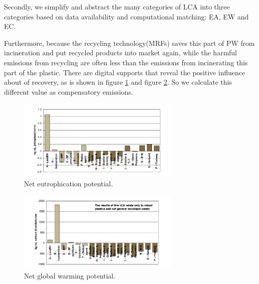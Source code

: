 \documentclass{mcmthesis}
\begin{document}
Secondly, we simplify and abstract the many categories of LCA into three categories based on data availability and computational matching: EA, EW and EC.

Furthermore, because the recycling technology(MRFs) saves this part of PW from incineration and put recycled products into market again, while the harmful emissions from recycling are often less than the emissions from incinerating this part of the plastic\cite{Shonfield}. There are digital supports that reveal the positive influence about of recovery, as is shown in figure \ref{fig6} and figure \ref{fig7}. So we calculate this different value as compensatory emissions.

\begin{figure}[!htb] %
	\centering %
	\includegraphics[width=0.7\textwidth]{figures/PCA1.png} %
	\caption{Net eutrophication potential.} %
	\label{fig6} %
	
\end{figure}

\begin{figure}[!htb] %
	\centering %
	\includegraphics[width=0.7\textwidth]{figures/PCA2.png} %
	\caption{Net global warming potential.} %
	\label{fig7} %
	
\end{figure}
\end{document}
